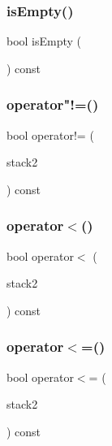 \mbox{\label{classStack_acf82f9b2937375c7b1cf3dccb3df3312}} 
\subsubsection{\texorpdfstring{is\+Empty()}{isEmpty()}}
{\footnotesize\ttfamily bool is\+Empty (\begin{DoxyParamCaption}{ }\end{DoxyParamCaption}) const}

\mbox{\label{classStack_a21017a086067b8ac1c21c3bdef97a100}} 
\subsubsection{\texorpdfstring{operator"!=()}{operator!=()}}
{\footnotesize\ttfamily bool operator!= (\begin{DoxyParamCaption}\item[{const \mbox{\hyperlink{classStack}{Stack}}$<$ Value\+Type $>$ \&}]{stack2 }\end{DoxyParamCaption}) const}

\mbox{\label{classStack_a6d1900aec1af12a907ad87301d464d2e}} 
\subsubsection{\texorpdfstring{operator$<$()}{operator<()}}
{\footnotesize\ttfamily bool operator$<$ (\begin{DoxyParamCaption}\item[{const \mbox{\hyperlink{classStack}{Stack}}$<$ Value\+Type $>$ \&}]{stack2 }\end{DoxyParamCaption}) const}

\mbox{\label{classStack_a8037a3a4cc044bcfba994893d6f4ab12}} 
\subsubsection{\texorpdfstring{operator$<$=()}{operator<=()}}
{\footnotesize\ttfamily bool operator$<$= (\begin{DoxyParamCaption}\item[{const \mbox{\hyperlink{classStack}{Stack}}$<$ Value\+Type $>$ \&}]{stack2 }\end{DoxyParamCaption}) const}

